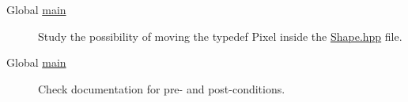 \label{todo__todo000001}
\hypertarget{todo__todo000001}{}
 \begin{description}
\item[Global \hyperlink{main_8cpp_bf9e6b7e6f15df4b525a2e7705ba3089}{main} ]Study the possibility of moving the typedef Pixel inside the \hyperlink{_shape_8hpp}{Shape.hpp} file. \end{description}


\label{todo__todo000001}
\hypertarget{todo__todo000001}{}
 \begin{description}
\item[Global \hyperlink{main_8cpp_bf9e6b7e6f15df4b525a2e7705ba3089}{main} ]Check documentation for pre- and post-conditions.

\end{description}
